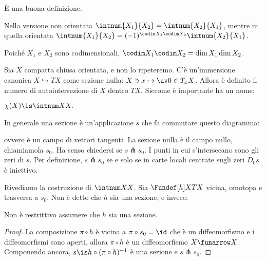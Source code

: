 \begin{teo}
	È una buona definizione.
\end{teo}

\begin{oss}
	Nella versione non orientata $\intnum{X_1}{X_2}=\intnum{X_2}{X_1}$, mentre in quella orientata $\intnum{X_1}{X_2}=(-1)^{\codim X_1\codim X_2}\intnum{X_2}{X_1}$.
\end{oss}

\begin{oss}
	Poiché $X_1$ e $X_2$ sono codimensionali, $\codim X_1\codim X_2=\dim X_1\dim X_2$.
\end{oss}


Sia $X$ compatta chiusa orientata, e non lo ripeteremo.
C'è un'immersione canonica $X\hookrightarrow TX$ come sezione nulla: $X\ni x\mapsto\av0\in T_xX$.
Allora è definito il numero di autointersezione di $X$ dentro $TX$.
Siccome è importante ha un nome:

\begin{defn}
	$\chi(X)\is\intnum XX.$
\end{defn}

In generale una sezione è un'applicazione $s$ che fa commutare questo diagramma:
\begin{center}
\end{center}
ovvero è un campo di vettori tangenti.
La sezione nulla è il campo nullo, chiamiamola $s_0$.
Ha senso chiedersi se $s\pitchfork s_0$.
I punti in cui s'intersecano sono gli zeri di $s$.
Per definizione, $s\pitchfork s_0$ se e solo se in carte locali centrate sugli zeri $D_0s$ è iniettivo.

Rivediamo la costruzione di $\intnum XX$.
Sia $\Fundef[h]X{TX}$ vicina, omotopa e trasversa a $s_0$.
Non è detto che $h$ sia una sezione, e invece:

\begin{lemma}
	Non è restrittivo assumere che $h$ sia una sezione.
\end{lemma}

\begin{proof}
	La composizione $\pi\circ h$ è vicina a $\pi\circ s_0=\id$ che è un diffeomorfismo e i diffeomorfismi sono aperti, allora \wlg $\pi\circ h$ è un diffeomorfismo $X\funarrow X$.
	Componendo ancora, $s\is h\circ(\pi\circ h)^{-1}$ è una sezione e $s\pitchfork s_0$\footnotemark.
\end{proof}

